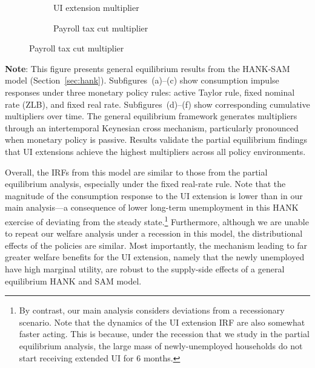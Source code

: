 \documentclass[qe,draft]{econsocart}
\theoremstyle{plain}
\theoremstyle{definition}
\begin{document}
\begin{figure}[H]
\begin{minipage}{\textwidth}
\begin{subfigure}[b]{.30\linewidth}
      \caption{UI extension multiplier}
      \label{fig:HANK_UI_multiplier} %
    \end{subfigure}
    \begin{subfigure}[b]{.30\linewidth}
      \centering
      \caption{Payroll tax cut multiplier}
      \label{fig:HANK_tax_multiplier} %
    \end{subfigure}
  \end{minipage}
\end{figure}
\noindent\parbox{\textwidth}{\footnotesize
  \textbf{Note}: This figure presents general equilibrium results from the HANK-SAM model (Section~\ref{sec:hank}).
  Subfigures~(a)--(c) show consumption impulse responses under three monetary policy rules:
  active Taylor rule, fixed nominal rate (ZLB), and fixed real rate.
  Subfigures~(d)--(f) show corresponding cumulative multipliers over time.
  The general equilibrium framework generates multipliers through an intertemporal Keynesian cross mechanism,
  particularly pronounced when monetary policy is passive.
  Results validate the partial equilibrium findings that UI extensions achieve the highest multipliers
  across all policy environments.
}

\vspace{1em}  %


Overall, the IRFs from this model are similar to those from the partial equilibrium analysis, especially under the fixed real-rate rule. Note that the magnitude of the consumption response to the UI extension is lower than in our main analysis---a consequence of lower long-term unemployment in this HANK exercise of deviating from the steady state.\footnote{By contrast, our main analysis considers deviations from a recessionary scenario. Note that the dynamics of the UI extension IRF are also somewhat faster acting.
  This is because, under the recession that we study in the partial equilibrium analysis, the large mass of newly-unemployed households do not start receiving extended UI for 6 months.
} Furthermore, although we are unable to repeat our welfare analysis under a recession in this model, the distributional effects of the policies are similar.
Most importantly, the mechanism leading to far greater welfare benefits for the UI extension, namely that the newly unemployed have high marginal utility, are robust to the supply-side effects of a general equilibrium HANK and SAM model.
\end{document}
